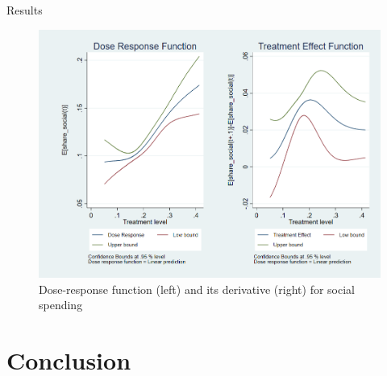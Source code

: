 \documentclass[c]{beamer}  %
\begin{document}
    \begin{frame}{Results}
        \begin{figure}[h!]
        \centering
        \includegraphics[scale = 0.25]{Thesis/Figures/graph_social.png}
        \caption{Dose-response function (left) and its derivative (right) for social spending}
        \label{fig:graph_educ}
    \end{figure}
    \end{frame}
    
    \section{Conclusion}
    
\end{document}
